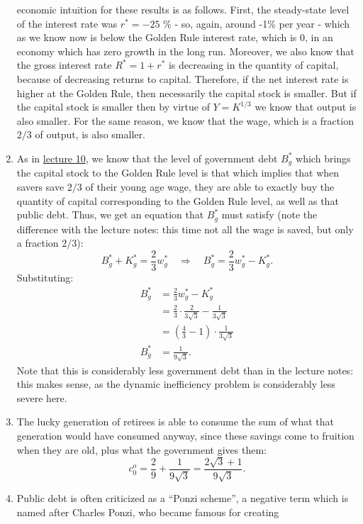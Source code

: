 \documentclass[]{book}
\theoremstyle{definition}
\theoremstyle{definition}
\theoremstyle{definition}
\theoremstyle{remark}
\begin{document}
\begin{enumerate}
  economic intuition for these results is as follows. First, the
  steady-state level of the interest rate was \(r^{*}=-25\) \% - so,
  again, around -1\% per year - which as we know now is below the Golden
  Rule interest rate, which is 0, in an economy which has zero growth in
  the long run. Moreover, we also know that the gross interest rate
  \(R^{*}=1+r^{*}\) is decreasing in the quantity of capital, because of
  decreasing returns to capital. Therefore, if the net interest rate is
  higher at the Golden Rule, then necessarily the capital stock is
  smaller. But if the capital stock is smaller then by virtue of
  \(Y=K^{1/3}\) we know that output is also smaller. For the same
  reason, we know that the wage, which is a fraction \(2/3\) of output,
  is also smaller.
\item
  As in \protect\hyperlink{public-debt}{lecture 10}, we know that the
  level of government debt \(B^{*}_g\) which brings the capital stock to
  the Golden Rule level is that which implies that when savers save
  \(2/3\) of their young age wage, they are able to exactly buy the
  quantity of capital corresponding to the Golden Rule level, as well as
  that public debt. Thus, we get an equation that \(B^{*}_g\) must
  satisfy (note the difference with the lecture notes: this time not all
  the wage is saved, but only a fraction \(2/3\)):
  \[B^{*}_g+K^{*}_g=\frac{2}{3}w^{*}_g\quad\Rightarrow\quad B^{*}_g=\frac{2}{3}w^{*}_g-K^{*}_g.\]
  Substituting: \[
  \begin{aligned}
  B^{*}_g&=\frac{2}{3}w^{*}_g-K^{*}_g\\
  &=\frac{2}{3} \cdot \frac{2}{3\sqrt{3}}-\frac{1}{3\sqrt{3}}\\
  &=\left(\frac{4}{3}-1\right) \cdot \frac{1}{3\sqrt{3}}\\
  B^{*}_g&=\frac{1}{9\sqrt{3}}.
  \end{aligned}
  \] Note that this is considerably less government debt than in the
  lecture notes: this makes sense, as the dynamic inefficiency problem
  is considerably less severe here.
\item
  The lucky generation of retirees is able to consume the sum of what
  that generation would have consumed anyway, since these savings come
  to fruition when they are old, plus what the government gives them:
  \[c_{0}^{o}=\frac{2}{9}+\frac{1}{9\sqrt{3}}=\frac{2\sqrt{3}+1}{9\sqrt{3}}.\]
\item
  Public debt is often criticized as a ``Ponzi scheme'', a negative term
  which is named after Charles Ponzi, who became famous for creating

\end{enumerate}
\end{document}
